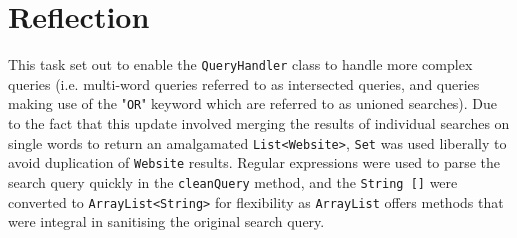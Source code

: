 \section{Reflection} %
This task set out to enable the {\tt QueryHandler} class to handle more complex queries (i.e. multi-word queries referred to as intersected queries, and queries making use of the "{\tt OR}" keyword which are referred to as unioned searches).
Due to the fact that this update involved merging the results of individual searches on single words to return an amalgamated {\tt List<Website>}, {\tt Set} was used liberally to avoid duplication of {\tt Website} results.
Regular expressions were used to parse the search query quickly in the {\tt cleanQuery} method, and the {\tt String []} were converted to {\tt ArrayList<String>} for flexibility as {\tt ArrayList} offers methods that were integral in sanitising the original search query.
